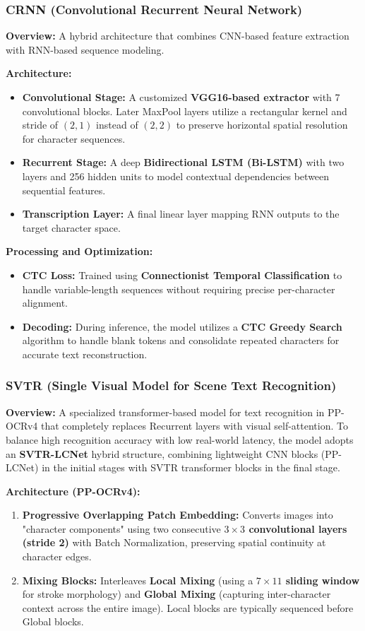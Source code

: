 \subsubsection{CRNN (Convolutional Recurrent Neural Network)}
\textbf{Overview:} A hybrid architecture that combines CNN-based feature extraction with RNN-based sequence modeling.

\textbf{Architecture:}
\begin{itemize}
    \item \textbf{Convolutional Stage:} A customized \textbf{VGG16-based extractor} with 7 convolutional blocks. Later MaxPool layers utilize a rectangular kernel and stride of \textbf{$(2, 1)$} instead of $(2, 2)$ to preserve horizontal spatial resolution for character sequences.
    \item \textbf{Recurrent Stage:} A deep \textbf{Bidirectional LSTM (Bi-LSTM)} with two layers and 256 hidden units to model contextual dependencies between sequential features.
    \item \textbf{Transcription Layer:} A final linear layer mapping RNN outputs to the target character space.
\end{itemize}

\textbf{Processing and Optimization:}
\begin{itemize}
    \item \textbf{CTC Loss:} Trained using \textbf{Connectionist Temporal Classification} to handle variable-length sequences without requiring precise per-character alignment.
    \item \textbf{Decoding:} During inference, the model utilizes a \textbf{CTC Greedy Search} algorithm to handle blank tokens and consolidate repeated characters for accurate text reconstruction.
\end{itemize}

\subsubsection{SVTR (Single Visual Model for Scene Text Recognition)}
\textbf{Overview:} A specialized transformer-based model for text recognition in PP-OCRv4 that completely replaces Recurrent layers with visual self-attention. To balance high recognition accuracy with low real-world latency, the model adopts an \textbf{SVTR-LCNet} hybrid structure, combining lightweight CNN blocks (PP-LCNet) in the initial stages with SVTR transformer blocks in the final stage.

\textbf{Architecture (PP-OCRv4):}
\begin{enumerate}
    \item \textbf{Progressive Overlapping Patch Embedding:} Converts images into "character components" using two consecutive \textbf{$3 \times 3$ convolutional layers (stride 2)} with Batch Normalization, preserving spatial continuity at character edges.
    \item \textbf{Mixing Blocks:} Interleaves \textbf{Local Mixing} (using a \textbf{$7 \times 11$ sliding window} for stroke morphology) and \textbf{Global Mixing} (capturing inter-character context across the entire image). Local blocks are typically sequenced before Global blocks.
\end{enumerate}

